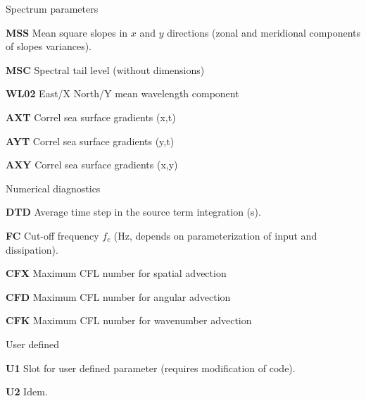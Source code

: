 \begin{list}{)\hfill}
\item{Spectrum parameters}

\begin{list}{)\hfill}
            { \leftmargin 8mm 
             \rightmargin 0mm \itemsep 0mm \parsep 0mm}

\item \textbf{MSS} Mean square slopes in $x$ and $y$ directions (zonal and meridional components of slopes variances). 
\item \textbf{MSC} Spectral tail level (without dimensions) 
\item \textbf{WL02}  East/X North/Y mean wavelength component
\item \textbf{AXT}   Correl sea surface gradients (x,t)
\item \textbf{AYT}   Correl sea surface gradients (y,t)
\item \textbf{AXY}   Correl sea surface gradients (x,y)
\end{list}

\item{Numerical diagnostics }

\begin{list}{)\hfill}
            { \leftmargin 8mm 
             \rightmargin 0mm \itemsep 0mm \parsep 0mm}
\item \textbf{DTD} Average time step in the source term integration (s).
\item \textbf{FC} Cut-off frequency $f_c$ (Hz, depends on parameterization of
      input and dissipation).
\item \textbf{CFX} Maximum CFL number for spatial advection 
\item \textbf{CFD} Maximum CFL number for angular advection 
\item \textbf{CFK} Maximum CFL number for wavenumber advection 
\end{list}

\item{User defined }

\begin{list}{)\hfill}
            { \leftmargin 8mm 
             \rightmargin 0mm \itemsep 0mm \parsep 0mm}

\item \textbf{U1} Slot for user defined parameter (requires modification of code).
\item \textbf{U2} Idem.
\end{list}

\end{list}




